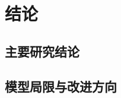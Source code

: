 \section{结论}\label{sec:conclusion}

\subsection{主要研究结论}\label{sec:main-conclusions}
\writingplaceholder

\subsection{模型局限与改进方向}\label{sec:limitations}
\writingplaceholder
